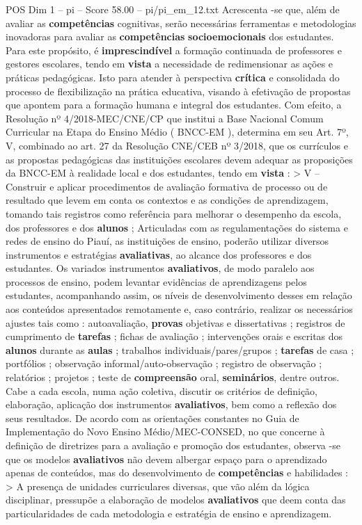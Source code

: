 \begin{textsample}{POS Dim 1 – pi – Score 58.00 – pi/pi\_em\_12.txt}
Acrescenta -se que, além de avaliar as \textbf{competências} cognitivas, serão necessárias ferramentas e metodologias inovadoras para avaliar as \textbf{competências} \textbf{socioemocionais} dos estudantes.
Para este propósito, é \textbf{imprescindível} a formação continuada de professores e gestores escolares, tendo em \textbf{vista} a necessidade de redimensionar as ações e práticas pedagógicas.
Isto para atender à perspectiva \textbf{crítica} e consolidada do processo de flexibilização na prática educativa, visando à efetivação de propostas que apontem para a formação humana e integral dos estudantes.
Com efeito, a Resolução nº 4/2018-MEC/CNE/CP que institui a Base Nacional Comum Curricular na Etapa do Ensino Médio ( BNCC-EM ), determina em seu Art. 7º, V, combinado ao art. 27 da Resolução CNE/CEB nº 3/2018, que os currículos e as propostas pedagógicas das instituições escolares devem adequar as proposições da BNCC-EM à realidade local e dos estudantes, tendo em \textbf{vista} : > V – Construir e aplicar procedimentos de avaliação formativa de processo ou de resultado que levem em conta os contextos e as condições de aprendizagem, tomando tais registros como referência para melhorar o desempenho da escola, dos professores e dos \textbf{alunos} ; Articuladas com as regulamentações do sistema e redes de ensino do Piauí, as instituições de ensino, poderão utilizar diversos instrumentos e estratégias \textbf{avaliativas}, ao alcance dos professores e dos estudantes.
Os variados instrumentos \textbf{avaliativos}, de modo paralelo aos processos de ensino, podem levantar evidências de aprendizagens pelos estudantes, acompanhando assim, os níveis de desenvolvimento desses em relação aos conteúdos apresentados remotamente e, caso contrário, realizar os necessários ajustes tais como : autoavaliação, \textbf{provas} objetivas e dissertativas ; registros de cumprimento de \textbf{tarefas} ; fichas de avaliação ; intervenções orais e escritas dos \textbf{alunos} durante as \textbf{aulas} ; trabalhos individuais/pares/grupos ; \textbf{tarefas} de casa ; portfólios ; observação informal/auto-observação ; registro de observação ; relatórios ; projetos ; teste de \textbf{compreensão} oral, \textbf{seminários}, dentre outros.
Cabe a cada escola, numa ação coletiva, discutir os critérios de definição, elaboração, aplicação dos instrumentos \textbf{avaliativos}, bem como a reflexão dos seus resultados.
De acordo com as orientações constantes no Guia de Implementação do Novo Ensino Médio/MEC-CONSED, no que concerne à definição de diretrizes para a avaliação e promoção dos estudantes, observa -se que os modelos \textbf{avaliativos} não devem albergar espaço para o aprendizado apenas de conteúdos, mas do desenvolvimento de \textbf{competências} e habilidades : > A presença de unidades curriculares diversas, que vão além da lógica disciplinar, pressupõe a elaboração de modelos \textbf{avaliativos} que deem conta das particularidades de cada metodologia e estratégia de ensino e aprendizagem.

\end{textsample}
